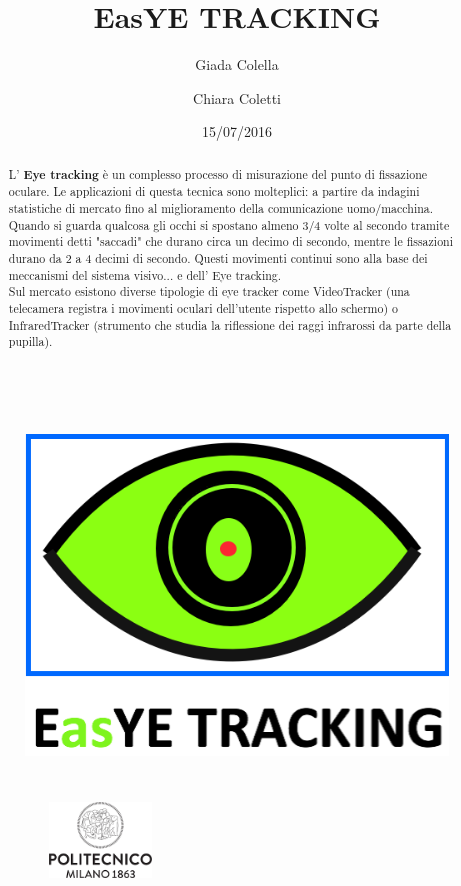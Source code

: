 \documentclass[12pt]{article}
\title{\textbf{EasYE TRACKING}}
\author{Giada Colella \and Chiara Coletti}
\date{15/07/2016}
\begin{document}
	
	\begin{figure}
		\centering
		\includegraphics[width=15cm,height=10cm]{EasYE_TRACKING_logob}
	\end{figure}

\maketitle


\begin{figure}
	\centering
	\includegraphics[width=4cm,height=2cm]{logopolimi}
\end{figure}



\pagebreak

\tableofcontents

\pagebreak

\begin{abstract}
	L' \textbf{Eye tracking} \`e un complesso processo di misurazione del punto di fissazione oculare. Le applicazioni di questa tecnica sono molteplici: a partire da indagini statistiche di mercato fino al miglioramento della comunicazione uomo/macchina.\\
	Quando si guarda qualcosa gli occhi si spostano almeno 3/4 volte al secondo tramite movimenti detti "saccadi" che durano circa un decimo di secondo, mentre le fissazioni durano da 2 a 4 decimi di secondo. Questi movimenti continui sono alla base dei meccanismi del sistema visivo... e dell' Eye tracking. \\
	Sul mercato esistono diverse tipologie di eye tracker come VideoTracker (una telecamera registra i movimenti oculari dell'utente rispetto allo schermo) o InfraredTracker (strumento che studia la riflessione dei raggi infrarossi da parte della pupilla).
\end{abstract}
\pagebreak
\end{document}
